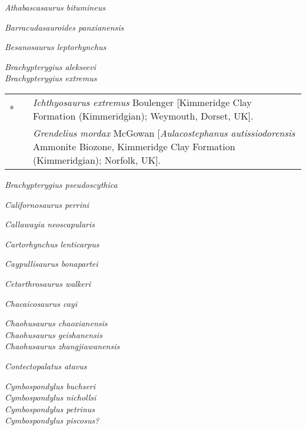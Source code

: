 \documentclass[british,11pt]{article}
\newenvironment*{synonymy}%
	{
		\footnotesize
		\begin{tabu}[l]{rlX}
	}%
	{
		\\
		\end{tabu}
		\normalsize
	}
\begin{document}
\emph{Athabascasaurus bitumineus} \cite*[Druckenmiller \& Maxwell,][]{Druckenmiller2010}

\emph{Barracudasauroides panxianensis} \parencite*[Jiang et al.,][]{Jiang2006}

\emph{Besanosaurus leptorhynchus} \cite*[Dal Sasso \& Pinna,][]{DalSasso1996}

\emph{Brachypterygius alekseevi} \parencite*[Arkhangelsky,][]{Arkhangelsky2001}\\
\emph{Brachypterygius extremus} \parencite*[Boulenger,][]{Boulenger1904}\\
\begin{synonymy}
	*	&	\cite*{Boulenger1904}	&	\emph{Ichthyosaurus extremus} Boulenger [Kimmeridge Clay Formation (Kimmeridgian); Weymouth, Dorset, UK]. \\
		&	\cite*{McGowan1976}	&	\emph{Grendelius mordax} McGowan [\emph{Aulacostephanus autissiodorensis} Ammonite Biozone, Kimmeridge Clay Formation (Kimmeridgian); Norfolk, UK].
\end{synonymy}
\emph{Brachypterygius pseudoscythica} \parencite*[Efimov,][]{Efimov1998}

\emph{Californosaurus perrini} \parencite*[Merriam,][]{Merriam1902}

\emph{Callawayia neoscapularis} \parencite*[McGowan,][]{McGowan1994}

\emph{Cartorhynchus lenticarpus} \cite*[Motani et al.,][]{Motani2014a}

\emph{Caypullisaurus bonapartei} \cite*[Fernández,][]{Fernandez1997a}

\emph{Cetarthrosaurus walkeri} \cite*[Seeley,][]{Seeley1873}

\emph{Chacaicosaurus cayi} \cite*[Fernández,][]{Fernandez1994}

\emph{Chaohusaurus chaoxianensis} \parencite*[Chen,][]{Chen1985}\\
\emph{Chaohusaurus geishanensis} \cite*[Young \& Dong,][]{Young1972}\\
\emph{Chaohusaurus zhangjiawanensis} \cite*[Chen et al.,][]{Chen2013}

\emph{Contectopalatus atavus} \parencite*[Quenstedt,][]{Quenstedt1852}

\emph{Cymbospondylus buchseri} \cite*[Sander,][]{Sander1989}\\
\emph{Cymbospondylus nichollsi} \cite*[Fröbisch et al.,][]{Frobisch2006}\\
\emph{Cymbospondylus petrinus} \cite*[Leidy,][]{Leidy1868}\\
\emph{Cymbospondylus piscosus?} \cite*[Leidy,][]{Leidy1868}
\end{document}
